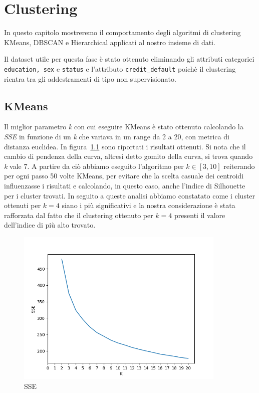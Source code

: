 \chapter{Clustering}
In questo capitolo mostreremo il comportamento 
degli algoritmi di clustering KMeans, DBSCAN 
e Hierarchical applicati al nostro insieme di 
dati.

Il dataset utile per questa fase \`e stato
ottenuto eliminando gli attributi categorici
\texttt{education, sex} e \texttt{status} 
e l'attributo \texttt{credit\_default} 
poich\`e il clustering rientra tra 
gli addestramenti di tipo non supervisionato.

\section{KMeans}

Il miglior parametro \textit{k} con cui eseguire 
KMeans \`e stato ottenuto calcolando la 
\textit{SSE} in funzione di un \textit{k} che variava  in un range da 
2 a 20, con metrica di distanza euclidea. 
In figura~\ref{fig:best_k} sono riportati 
i risultati ottenuti. Si nota che il cambio di
pendenza della curva, altresì detto gomito della curva, si trova quando \textit{k}
vale 7. A partire da ci\`o abbiamo eseguito l'algoritmo
per $k\in[3,10]$ reiterando per ogni passo 50 volte
KMeans, per evitare che la scelta casuale dei centroidi
influenzasse i risultati e calcolando, in questo caso,
anche l'indice di Silhouette per i cluster trovati.
In seguito a queste analisi abbiamo constatato come
i cluster ottenuti per $k=4$ siano i pi\`u significativi e
la nostra considerazione \`e stata rafforzata dal fatto
che il clustering ottenuto per $k=4$ presenti il valore
dell'indice di \sil pi\`u alto trovato.

\begin{figure}[H]
	\centering
	\includegraphics[width=10cm]{img/best_k.png}
	\caption[LOF entry]{SSE}
	\label{fig:best_k}
\end{figure} 

